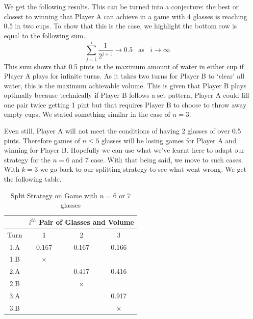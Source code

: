 \documentclass[11pt]{article}
\newcommand{\keywordfont}{\textsc}
\newcommand{\keyword}[1]{%
  \marginpar{\raggedright\small\keywordfont{#1}}}
\begin{document}
We get the following results. This can be turned into a conjecture: \keyword{Conjecture} the best or closest to winning that Player A can achieve in a game with 4 glasses is reaching 0.5 in two cups. To show that this is the case, we highlight the bottom row is equal to the following sum.
\[
\sum^{i}_{j=1}{\frac{1}{2^{j+1}}} \to 0.5 \hspace{10pt} \text{as} \hspace{10pt} i \to \infty
\]
This sum \keyword{Justify}shows that 0.5 pints is the maximum amount of water in either cup if Player A plays for infinite turns. As it takes two turns for Player B to `clear' all water, this is the maximum achievable volume. This is given that Player B plays optimally because technically if Player B follows a set pattern, Player A could fill one pair twice getting 1 pint but that requires Player B to choose to throw away empty cups. We stated something similar in the case of $n=3$.

Even still, Player A will not meet the conditions of having 2 glasses of over 0.5 pints. Therefore games of $n \leq 5$ glasses will be losing games \keyword{AHA}for Player A and winning for Player B. Hopefully we can use what we've learnt here to adapt our strategy for the $n=6$ and 7 case. With that being said, we move to such cases. With $k = 3$ we go back to our splitting strategy to see what went wrong. \keyword{Stuck} We get the following table. 


\begin{table}[h]
    \centering
    \begin{tabular}{|c|c|c|c|} \hline 
         &  \multicolumn{3}{|c|}{$i^{th}$ Pair of Glasses and Volume}\\ \hline 
         Turn
&   1&2& 3\\ \hline 
         1.A
&   0.167&0.167& 0.166\\ \hline 
         
1.B
&   $\times$&& \\ \hline 
         2.A
&   &0.417& 0.416\\ \hline 
 2.B
&  &$\times$&\\ \hline 
 3.A
&  &&0.917\\ \hline 
 3.B
&  &&$\times$\\ \hline
    \end{tabular}
    \caption{Split Strategy on Game with $n = 6$ or 7 glasses}
    \label{tab:my_label}
\end{table}
\end{document}
